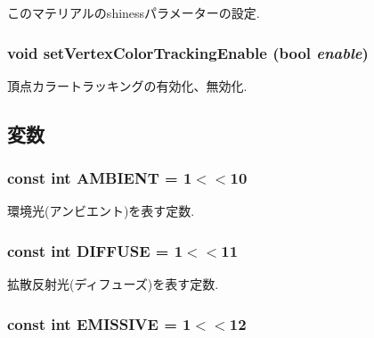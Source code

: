 このマテリアルのshinessパラメーターの設定. \hypertarget{classm3g_1_1Material_55778ceeb6408e5db698c793dea1edd6}{
\subsubsection[{setVertexColorTrackingEnable}]{\setlength{\rightskip}{0pt plus 5cm}void setVertexColorTrackingEnable (bool {\em enable})}}
\label{classm3g_1_1Material_55778ceeb6408e5db698c793dea1edd6}


頂点カラートラッキングの有効化、無効化. 

\subsection{変数}
\hypertarget{classm3g_1_1Material_4cf648a82d9de62a1fb15f4277049594}{
\subsubsection[{AMBIENT}]{\setlength{\rightskip}{0pt plus 5cm}const int {\bf AMBIENT} = 1$<$$<$10}}
\label{classm3g_1_1Material_4cf648a82d9de62a1fb15f4277049594}


環境光(アンビエント)を表す定数. \hypertarget{classm3g_1_1Material_9798073e44254569f47464dc6bf5da89}{
\subsubsection[{DIFFUSE}]{\setlength{\rightskip}{0pt plus 5cm}const int {\bf DIFFUSE} = 1$<$$<$11}}
\label{classm3g_1_1Material_9798073e44254569f47464dc6bf5da89}


拡散反射光(ディフューズ)を表す定数. \hypertarget{classm3g_1_1Material_b92d57adf6955eae6adac15e865659cd}{
\subsubsection[{EMISSIVE}]{\setlength{\rightskip}{0pt plus 5cm}const int {\bf EMISSIVE} = 1$<$$<$12}}
\label{classm3g_1_1Material_b92d57adf6955eae6adac15e865659cd}


